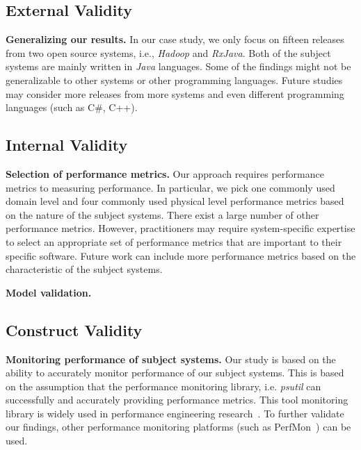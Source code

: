 \subsection{External Validity}

\textbf{Generalizing our results. }In our case study, we only focus on fifteen releases from two open source systems, i.e., \emph{Hadoop} and \emph{RxJava}. Both of the subject systems are mainly written in \emph{Java} languages. Some of the findings might not be generalizable to other systems or other programming languages. Future studies may consider more releases from more systems and even different programming languages (such as C\#, C++). 

\subsection{Internal Validity}

\textbf{Selection of performance metrics.} Our approach requires performance metrics to measuring performance. In particular, we pick one commonly used domain level and four commonly used physical level performance metrics based on the nature of the subject systems. There exist a large number of other performance metrics. However, practitioners may require system-specific expertise to select an appropriate set of performance metrics that are important to their specific software. Future work can include more performance metrics based on the characteristic of the subject systems. 

\textbf{Model validation.} 

\subsection{Construct Validity}

\textbf{Monitoring performance of subject systems.} Our study is based on the ability to accurately monitor performance of our subject systems. This is based on the assumption that the performance monitoring library, i.e. \emph{psutil} can successfully and accurately providing performance metrics. This tool monitoring library is widely used in performance engineering research~\cite{peterfse,tarekmsr16}. To further validate our findings, other performance monitoring platforms (such as PerfMon~\cite{perfmon}) can be used. 



